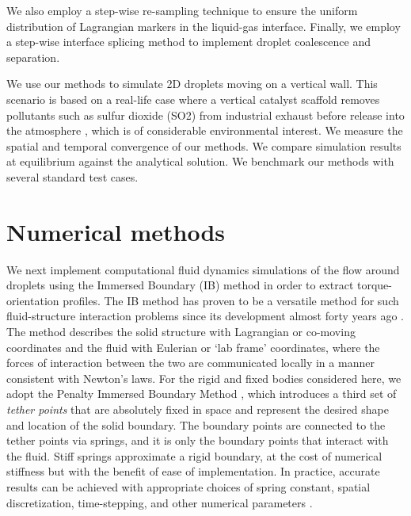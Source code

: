 \documentclass{jfm}
\begin{document}
We also employ a step-wise re-sampling technique to ensure the uniform distribution of Lagrangian markers in the liquid-gas interface. Finally, we employ a step-wise interface splicing method to implement droplet coalescence and separation. 

We use our methods to simulate 2D droplets moving on a vertical wall. This scenario is based on a real-life case where a vertical catalyst scaffold removes pollutants such as sulfur dioxide (SO2) from industrial exhaust before release into the atmosphere \citep{MPIreport2018}, which is of considerable environmental interest. We measure the spatial and temporal convergence of our methods. We compare simulation results at equilibrium against the analytical solution. We benchmark our methods with several standard test cases. 

\section{Numerical methods} \label{sec:numerical}
We next implement computational fluid dynamics simulations of the flow around droplets using the Immersed Boundary (IB) method in order to extract torque-orientation profiles. The IB method has proven to be a versatile method for such fluid-structure interaction problems since its development almost forty years ago \citep{peskin1972flow,mcqueen1997shared,arthurs1998modeling,lai2000immersed,griffith2009simulating,balboa2011staggered,devendran2012immersed}. The method describes the solid structure with Lagrangian or co-moving coordinates and the fluid with Eulerian or `lab frame' coordinates, where the forces of interaction between the two are communicated locally in a manner consistent with Newton's laws. For the rigid and fixed bodies considered here, we adopt the Penalty Immersed Boundary Method \citep{kim2016penalty}, which introduces a third set of \textit{tether points} that are absolutely fixed in space and represent the desired shape and location of the solid boundary. The boundary points are connected to the tether points via springs, and it is only the boundary points that interact with the fluid. Stiff springs approximate a rigid boundary, at the cost of numerical stiffness but with the benefit of ease of implementation. In practice, accurate results can be achieved with appropriate choices of spring constant, spatial discretization, time-stepping, and other numerical parameters \citep{kim2016penalty}. 
\end{document}
